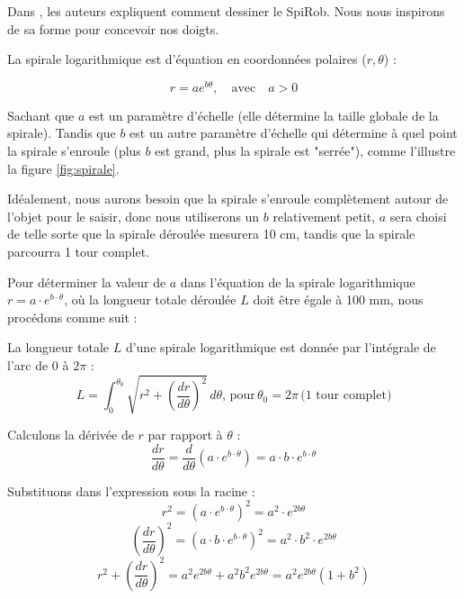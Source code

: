 \documentclass[a4paper, 11pt]{report}
\begin{document}
            Dans \cite{wang_spirobs_2025}, les auteurs expliquent comment dessiner le SpiRob. Nous nous inspirons de sa forme pour concevoir nos doigts.
        
            La spirale logarithmique est d'équation en coordonnées polaires ($r, \theta$) :

            \begin{equation}
                r = ae^{b\theta}, \quad \text{avec} \quad a > 0
                \label{eq:spirale_log}
            \end{equation}
            
            Sachant que $a$ est un paramètre d’échelle (elle détermine la taille globale de la spirale). Tandis que $b$ est un autre paramètre d’échelle qui détermine à quel point la spirale s’enroule (plus $b$ est grand, plus la spirale est "serrée"), comme l'illustre la figure \ref{fig:spirale}.
            
            Idéalement, nous aurons besoin que la spirale s'enroule complètement autour de l'objet pour le saisir, donc nous utiliserons un $b$ relativement petit, $a$ sera choisi de telle sorte que la spirale déroulée mesurera 10 cm, tandis que la spirale parcourra 1 tour complet.
        
            Pour déterminer la valeur de \( a \) dans l'équation de la spirale logarithmique \( r = a \cdot e^{b \cdot \theta} \), où la longueur totale déroulée \( L \) doit être égale à 100 mm, nous procédons comme suit :

            La longueur totale \( L \) d'une spirale logarithmique est donnée par l'intégrale de l'arc de $0$ à $2\pi$ :
            \[
            L = \int_0^{\theta_0} \sqrt{r^2 + \left(\frac{dr}{d\theta}\right)^2} \, d\theta, \, \text{pour} \, \theta_0 = 2\pi \, \text{(1 tour complet)}
            \]
            
            Calculons la dérivée de \( r \) par rapport à \( \theta \) :
            \[
            \frac{dr}{d\theta} = \frac{d}{d\theta} \left( a \cdot e^{b \cdot \theta} \right) = a \cdot b \cdot e^{b \cdot \theta}
            \]
            
            Substituons dans l'expression sous la racine :
            \[
            r^2 = \left( a \cdot e^{b \cdot \theta} \right)^2 = a^2 \cdot e^{2b \theta}
            \]
            \[
            \left( \frac{dr}{d\theta} \right)^2 = \left( a \cdot b \cdot e^{b \cdot \theta} \right)^2 = a^2 \cdot b^2 \cdot e^{2b \theta}
            \]
            \[
            r^2 + \left( \frac{dr}{d\theta} \right)^2 = a^2 e^{2b \theta} + a^2 b^2 e^{2b \theta} = a^2 e^{2b \theta} (1 + b^2)
            \]
            
\end{document}

